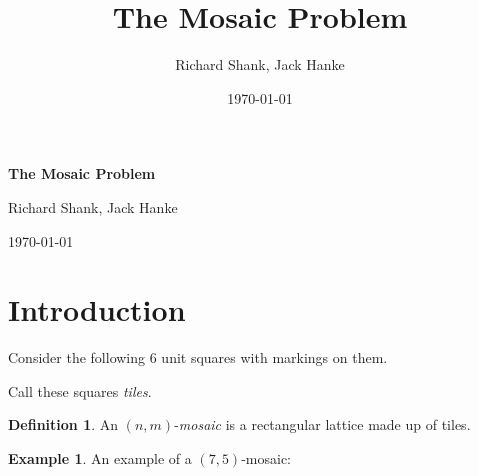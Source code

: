 \documentclass[12pt]{article}
\title{The Mosaic Problem}
\author{Richard Shank, Jack Hanke}
\date{\today}
\theoremstyle{plain}
\theoremstyle{definition}
\theoremstyle{remark}
\theoremstyle{definition}
\newtheorem{definition}{Definition}[section]
\newtheorem{exmp}{Example}[section]
\newcommand{\cellA}[4]{ \draw[thick] ( #1 , #2 ) rectangle ( #3 , #4 ); \draw[red, thick] (#3 * 0.5 + #1 * 0.5 , #2) -- (#3, #4 * 0.5 + #2 * 0.5);}
\newcommand{\cellB}[4]{ \draw[thick] ( #1 , #2 ) rectangle ( #3 , #4 ); \draw[red, thick] (#3 * 0.5 + #1 * 0.5 , #2) -- (#1, #4 * 0.5 + #2 * 0.5);}
\newcommand{\cellC}[4]{ \draw[thick] ( #1 , #2 ) rectangle ( #3 , #4 ); \draw[red, thick] (#3 * 0.5 + #1 * 0.5 , #4) -- (#1, #4 * 0.5 + #2 * 0.5);}
\newcommand{\cellD}[4]{ \draw[thick] ( #1 , #2 ) rectangle ( #3 , #4 ); \draw[red, thick] (#3 * 0.5 + #1 * 0.5 , #4) -- (#3, #4 * 0.5 + #2 * 0.5);}
\newcommand{\cellE}[4]{ \draw[thick] ( #1 , #2 ) rectangle ( #3 , #4 ); \draw[red, thick] (#3 * 0.5 + #1 * 0.5 , #2) -- (#3 * 0.5 + #1 * 0.5 , #4);}
\newcommand{\cellF}[4]{ \draw[thick] ( #1 , #2 ) rectangle ( #3 , #4 ); \draw[red, thick] (#3, #4 * 0.5 + #2 * 0.5) -- (#1, #4 * 0.5 + #2 * 0.5);}
\begin{document}
\begin{center}
    \Large
    \textbf{The Mosaic Problem}
    
    \vspace{0.4cm}
    \large
    
    Richard Shank, Jack Hanke   
    \vspace{0.4cm}
    
    \today
    \vspace{0.4cm}    
\end{center}

\section{Introduction}

Consider the following $6$ unit squares with markings on them.

\begin{center}
\end{center}

Call these squares \textit{tiles}. 

\begin{definition}
An $(n,m)$-\textit{mosaic} is a rectangular lattice made up of tiles.
\end{definition}

\begin{exmp}
An example of a $(7,5)$-mosaic:
\begin{center}
\end{center}
\end{exmp}
\end{document}
